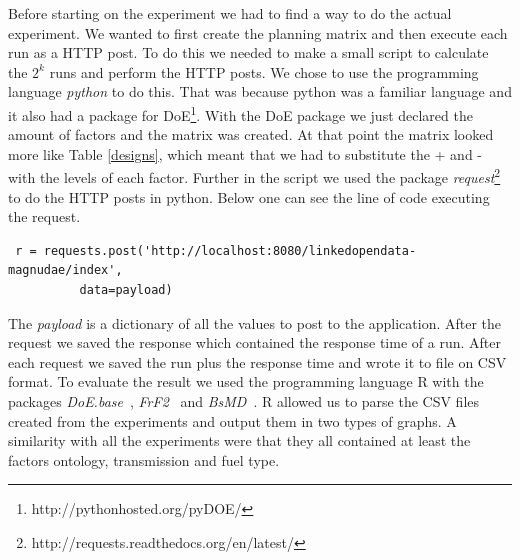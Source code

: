 \documentclass{llncs}
\begin{document}
Before starting on the experiment we had to find a way to do the
actual experiment. We wanted to first create the planning matrix and
then execute each run as a HTTP post. To do this we needed to make a
small script to calculate the $2^k$ runs and perform the HTTP
posts. We chose to use the programming language \textit{python} to do
this. That was because python was a familiar language and it also had
a package for DoE\footnote{http://pythonhosted.org/pyDOE/}. With the
DoE package we just declared the amount of factors and the matrix was
created. At that point the matrix looked more like Table
\ref{designs}, which meant that we had to substitute the + and - with
the levels of each factor.  Further in the script we used the package
\textit{request}\footnote{http://requests.readthedocs.org/en/latest/}
to do the HTTP posts in python. Below one can see the line of code
executing the request.

\scriptsize\begin{lstlisting}
 r = requests.post('http://localhost:8080/linkedopendata-magnudae/index', 
		  data=payload)
\end{lstlisting}
\normalsize

The \textit{payload} is a dictionary of all the values to post to the
application.  After the request we saved the response which contained
the response time of a run. After each request we saved the run plus
the response time and wrote it to file on CSV format. To evaluate the
result we used the programming language R with the packages
\textit{DoE.base}~\cite{DoEBase}, \textit{FrF2}~\cite{FrF2} and
\textit{BsMD}~\cite{BsMD}. R allowed us to parse the CSV files created
from the experiments and output them in two types of graphs.  A
similarity with all the experiments were that they all contained at
least the factors ontology, transmission and fuel type.
\end{document}

